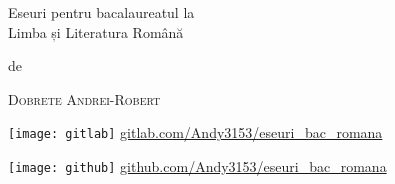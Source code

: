 \begin{titlepage}
 \centering
 \vspace*{1cm}
 \vspace{4\baselineskip}
 {\Huge
 Eseuri pentru bacalaureatul la \\ Limba și Literatura Română\par}
 \vspace{4\baselineskip}
 de\par
 {\Large\textsc{Dobrete Andrei-Robert}\par}
 \vfill
 \texttt{[image: gitlab]}
 \url{gitlab.com/Andy3153/eseuri_bac_romana}\par
 \texttt{[image: github]}
 \url{github.com/Andy3153/eseuri_bac_romana}\par
 \vspace{1.5\baselineskip}
 {\large\LaTeXe}
\end{titlepage}
